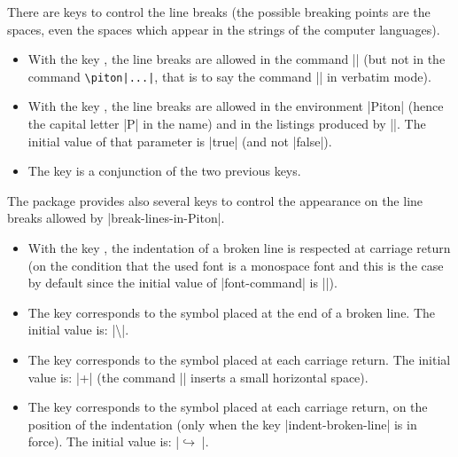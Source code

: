 \documentclass{article}
\begin{document}
\label{line-breaks}

There are keys to control the line breaks (the possible breaking points are
the spaces, even the spaces which appear in the strings of the computer
languages).
\begin{itemize}
\item {} With the key
, the line breaks are allowed in the command
|| (but not in the command \verb+\piton|...|+, that is to say the
command |\piton| in verbatim mode).
\item {} With the key
, the line breaks are allowed in the
environment |{Piton}| (hence the capital letter |P| in the name) and in the
listings produced by |\PitonInputFile|. The initial value of that parameter is
|true| (and not |false|).
\item {} The key  is a conjunction of
the two previous keys. 
\end{itemize}

\bigskip 
The package  provides also several keys to control the appearance
on the line breaks allowed by |break-lines-in-Piton|.

\begin{itemize}
\item {} With the key
, the indentation of a 
broken line is respected at carriage return (on the condition that the used
font is a monospace font and this is the case by default since the initial
value of |font-command| is |\ttfamily|).

\item The key  corresponds to the symbol placed
at the end of a broken line. The initial value is:
|\hspace*{0.5em}\textbackslash|.

\item {} The key 
corresponds to the symbol placed at each carriage return. The initial value
is: |+\;| (the command |\;| inserts a small horizontal space).

\item {} 
The key  corresponds to
the symbol placed at each carriage return, on the position of the indentation
(only when the key |indent-broken-line| is in force). The initial value is:
|$\hookrightarrow\;$|.
\end{itemize}
\end{document}
